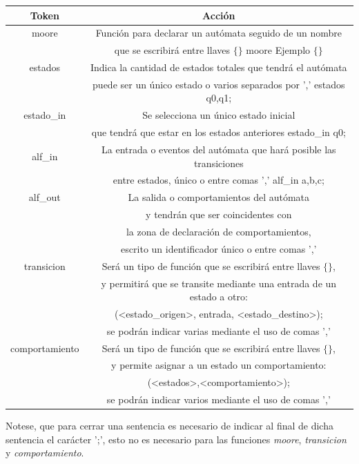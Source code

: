 \documentclass[12pt,a4paper]{article}
\begin{document}
\begin{center}
\begin{tabular}{|c|c|}
	\hline 
	\textbf{Token} & \textbf{Acción} \\ 
	\hline 
	moore & Función para declarar un autómata seguido de un nombre   \\
	& que se escribirá entre llaves $\{\}$ moore Ejemplo $\{\}$\\
	\hline 
	estados & Indica la cantidad de estados totales que tendrá el autómata  \\
	& puede ser un único estado o varios separados por ',' estados q0,q1;\\ 
	\hline 
	estado\_in & Se selecciona un único estado inicial  \\ 
	& que tendrá que estar en los estados anteriores estado\_in q0; \\
	\hline 
	alf\_in & La entrada o eventos del autómata que hará posible las transiciones\\
	& entre estados, único o entre comas ',' alf\_in a,b,c;\\
	\hline 
	alf\_out &  La salida o comportamientos del autómata  \\
	& y tendrán que ser coincidentes con \\ 
	& la zona de declaración de comportamientos, \\
	&  escrito un identificador único o entre comas ',' \\
	\hline
	transicion & Será un tipo de función que se escribirá entre llaves $\{\}$, \\
	& y permitirá que se transite mediante una entrada de un estado a otro: \\ 
	& (<estado\_origen>, entrada, <estado\_destino>); \\
	& se podrán indicar varias mediante el uso de comas ',' \\
	\hline 
	comportamiento & Será un tipo de función que se escribirá entre llaves $\{\}$,   \\ 
	& y permite asignar a un estado un comportamiento: \\
	& (<estados>,<comportamiento>); \\
	& se podrán indicar varios mediante el uso de comas ','\\
	\hline  
\end{tabular} 
\end{center}
Notese, que para cerrar una sentencia es necesario de indicar al final de dicha sentencia el carácter ';', esto no es necesario para las funciones \textit{moore}, \textit{transicion} y \textit{comportamiento}.
\newline
\end{document}
